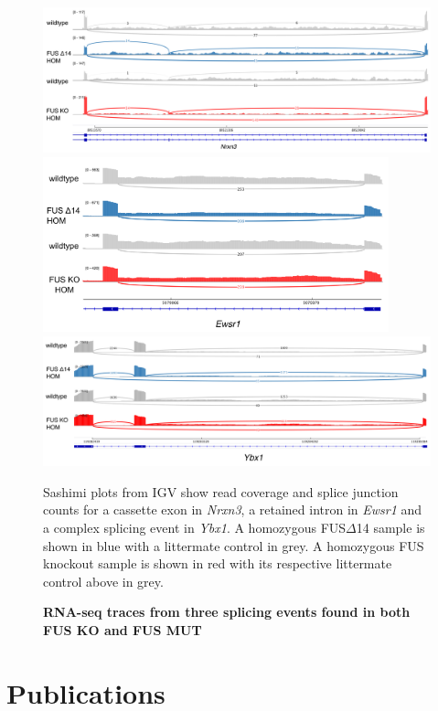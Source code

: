 \begin{appendices}
\begin{figure}
	
	\label{fig:fus_sex_heatmap}
\end{figure}

\begin{figure}
	\centering
	\includegraphics[width=\textwidth]{Figures/06_fus_meta/Nrxn3.png}
	\includegraphics[width=10cm]{Figures/06_fus_meta/Ewsr1.png}
	\includegraphics[width=\textwidth]{Figures/06_fus_meta/Ybx1.png}
	\caption{\textbf{RNA-seq traces from three splicing events found in both FUS KO and FUS MUT} }
	Sashimi plots from IGV show read coverage and splice junction counts for a cassette exon in \textit{Nrxn3}, a retained intron in \textit{Ewsr1} and a complex splicing event in \textit{Ybx1}.
	A homozygous FUS$\Delta$14 sample is shown in blue with a littermate control in grey. A homozygous FUS knockout sample is shown in red with its respective littermate control above in grey.
	\label{fig:fus_traces}
\end{figure}




\clearpage

\section*{Publications}


\end{appendices}
